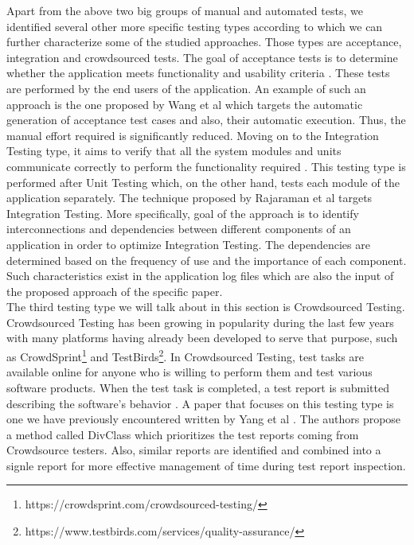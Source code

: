 Apart from the above two big groups of manual and automated tests, we identified several other more specific testing types according to which we can further characterize some of the studied approaches. Those types are 
acceptance, integration and crowdsourced tests. The goal of acceptance tests is to determine whether the application meets functionality and usability criteria \cite{artoftesting}. These tests are performed by the 
end users of the application. An example of such an approach is the one proposed by Wang et al \cite{wang2020automatic} which targets the automatic generation of acceptance test cases and also, 
their automatic execution. Thus, the manual effort required is significantly reduced. Moving on to the Integration Testing type, it aims to verify that all the system modules and units communicate correctly 
to perform the functionality required \cite{leung1990study}. This testing type is performed after Unit Testing which, on the other hand, tests each module of the application separately. The technique proposed by Rajaraman et 
al \cite{9197868} targets Integration Testing. More specifically, goal of the approach is to identify interconnections and dependencies between different components of an application in order to optimize Integration Testing. 
The dependencies are determined based on the frequency of use and the importance of each component. Such characteristics exist in the application log files which are also the input of the proposed approach of 
the specific paper.\\

The third testing type we will talk about in this section is Crowdsourced Testing. Crowdsourced Testing has been growing in popularity during the last few years with many platforms having already 
been developed to serve that purpose, such as CrowdSprint\footnote{https://crowdsprint.com/crowdsourced-testing/} and TestBirds\footnote{https://www.testbirds.com/services/quality-assurance/}. 
In Crowdsourced Testing, test tasks are available online for anyone who is willing to perform them and test various software products. When the test task is completed, a test report is submitted 
describing the software's behavior \cite{cui2017should}. A paper that focuses on this testing type is one we have previously encountered written by Yang et al \cite{9617598}. The authors 
propose a method called DivClass which prioritizes the test reports coming from Crowdsource testers. Also, similar reports are identified and combined into a signle report for more effective management 
of time during test report inspection.\\

